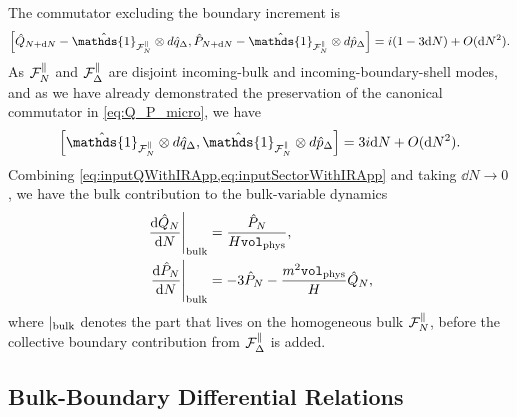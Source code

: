 \documentclass{article}
\def\cF{{\cal F}}
\newcommand{\openone}{\hat{\mathds{1}}}
\newcommand{\Vphys}{\mathtt{vol}_{\rm phys}}
\numberwithin{equation}{section}
\begin{document}
	The commutator excluding the boundary increment is
	\begin{equation}
		\left[ \hat Q_{N+\dd N}-\openone_{\cF_N^\parallel}\otimes d\hat q_\Delta, \hat P_{N+\dd N}-\openone_{\cF_N^\parallel}\otimes d\hat p_\Delta \right] = i(1-3\dd N)+O(\dd N^2).
	\end{equation}
	As \(\cF_N^\parallel\) and \(\cF_\Delta^\parallel\) are disjoint incoming-bulk and incoming-boundary-shell modes, and as we have already demonstrated the preservation of the canonical commutator in \cref{eq:Q_P_micro}, we have
	\begin{equation}
		\left[ \openone_{\cF_N^\parallel}\otimes d\hat q_\Delta, \openone_{\cF_N^\parallel}\otimes d\hat p_\Delta \right] = 3i \dd N+O(\dd N^2).
	\end{equation}
	Combining \cref{eq:inputQWithIRApp,eq:inputSectorWithIRApp} and taking \(\dd N\to0\), we have the bulk contribution to the bulk-variable dynamics
	\begin{align}
		\left.\dv{\hat Q_{N}}{N}\right|_{\rm bulk} &= \frac{\hat P_N}{H\Vphys},
		\label{eq:BulkDrift1}
		\\ \left.\dv{\hat P_{N}}{N}\right|_{\rm bulk} &= -3\hat P_N - \frac{m^2\Vphys}{H}\hat Q_N,
		\label{eq:BulkDrift2}
	\end{align}
	where \(|_{\rm bulk}\) denotes the part that lives on the homogeneous bulk \(\cF_N^\parallel\), before the collective boundary contribution from \(\cF_\Delta^\parallel\) is added.

	\subsection{Bulk-Boundary Differential Relations}
	\label{appA:boundary}
\end{document}
